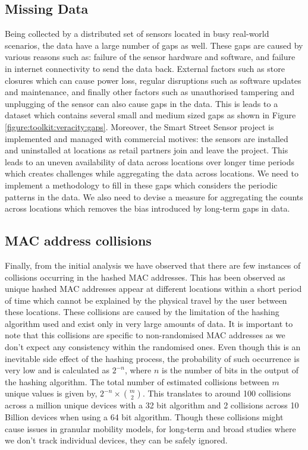 \subsection{Missing Data}
Being collected by a distributed set of sensors located in busy real-world scenarios, the data have a large number of gaps as well.
These gaps are caused by various reasons such as: failure of the sensor hardware and software, and failure in internet connectivity to send the data back.
External factors such as store closures which can cause power loss, regular disruptions such as software updates and maintenance, and finally other factors such as unauthorised tampering and unplugging of the sensor can also cause gaps in the data.
This is leads to a dataset which contains several small and medium sized gaps as shown in Figure \ref{figure:toolkit:veracity:gaps}.
Moreover, the Smart Street Sensor project is implemented and managed with commercial motives: the sensors are installed and uninstalled at locations as retail partners join and leave the project.
This leads to an uneven availability of data across locations over longer time periods which creates challenges while aggregating the data across locations.
We need to implement a methodology to fill in these gaps which considers the periodic patterns in the data.
We also need to devise a measure for aggregating the counts across locations which removes the bias introduced by long-term gaps in data.

\subsection{MAC address collisions}
Finally, from the initial analysis we have observed that there are few instances of collisions occurring in the hashed MAC addresses.
This has been observed as unique hashed MAC addresses appear at different locations within a short period of time which cannot be explained by the physical travel by the user between these locations.
These collisions are caused by the limitation of the hashing algorithm used and exist only in very large amounts of data.
It is important to note that this collisions are specific to non-randomised MAC addresses as we don't expect any consistency within the randomised ones.
Even though this is an inevitable side effect of the hashing process, the probability of such occurrence is very low and is calculated as \(2^{-n}\), where \(n\) is the number of bits in the output of the hashing algorithm.
The total number of estimated collisions between \(m\) unique values is given by, \(2^{-n} \times {m \choose 2}\)\cite{estcollision}.
This translates to around 100 collisions across a million unique devices with a 32 bit algorithm and 2 collisions across 10 Billion devices when using a 64 bit algorithm. 
Though these collisions might cause issues in granular mobility models, for long-term and broad studies where we don't track individual devices, they can be safely ignored.
